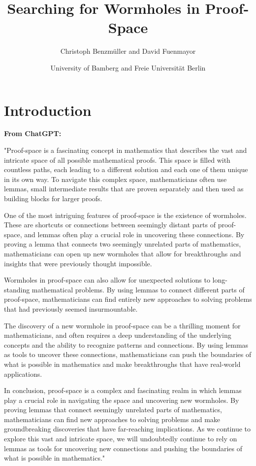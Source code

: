 \documentclass{article}
\title{Searching for Wormholes in Proof-Space}
\author{Christoph Benzmüller and David Fuenmayor}
\date{University of Bamberg and Freie Universität Berlin}
\begin{document}
\maketitle

\section{Introduction}

\textbf{From ChatGPT:}

"Proof-space is a fascinating concept in mathematics that describes the vast and intricate space of all possible mathematical proofs. This space is filled with countless paths, each leading to a different solution and each one of them unique in its own way. To navigate this complex space, mathematicians often use lemmas, small intermediate results that are proven separately and then used as building blocks for larger proofs.

One of the most intriguing features of proof-space is the existence of wormholes. These are shortcuts or connections between seemingly distant parts of proof-space, and lemmas often play a crucial role in uncovering these connections. By proving a lemma that connects two seemingly unrelated parts of mathematics, mathematicians can open up new wormholes that allow for breakthroughs and insights that were previously thought impossible.

Wormholes in proof-space can also allow for unexpected solutions to long-standing mathematical problems. By using lemmas to connect different parts of proof-space, mathematicians can find entirely new approaches to solving problems that had previously seemed insurmountable.

The discovery of a new wormhole in proof-space can be a thrilling moment for mathematicians, and often requires a deep understanding of the underlying concepts and the ability to recognize patterns and connections. By using lemmas as tools to uncover these connections, mathematicians can push the boundaries of what is possible in mathematics and make breakthroughs that have real-world applications.

In conclusion, proof-space is a complex and fascinating realm in which lemmas play a crucial role in navigating the space and uncovering new wormholes. By proving lemmas that connect seemingly unrelated parts of mathematics, mathematicians can find new approaches to solving problems and make groundbreaking discoveries that have far-reaching implications. As we continue to explore this vast and intricate space, we will undoubtedly continue to rely on lemmas as tools for uncovering new connections and pushing the boundaries of what is possible in mathematics."
\end{document}
